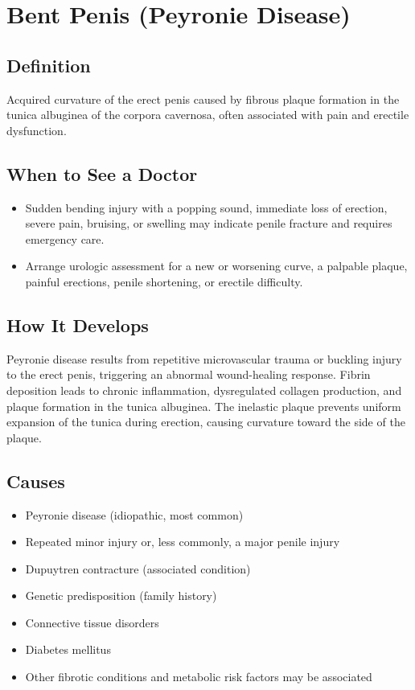 \chapter{Bent Penis (Peyronie Disease)}

\section*{Definition}
Acquired curvature of the erect penis caused by fibrous plaque formation in the tunica albuginea of the corpora cavernosa, often associated with pain and erectile dysfunction.

\section*{When to See a Doctor}

\begin{itemize}
 \item Sudden bending injury with a popping sound, immediate loss of erection, severe pain, bruising, or swelling may indicate penile fracture and requires emergency care.
 \item Arrange urologic assessment for a new or worsening curve, a palpable plaque, painful erections, penile shortening, or erectile difficulty.
\end{itemize}

\section*{How It Develops}
Peyronie disease results from repetitive microvascular trauma or buckling injury to the erect penis, triggering an abnormal wound-healing response. Fibrin deposition leads to chronic inflammation, dysregulated collagen production, and plaque formation in the tunica albuginea. The inelastic plaque prevents uniform expansion of the tunica during erection, causing curvature toward the side of the plaque.

\section*{Causes}
\begin{itemize}
 \item Peyronie disease (idiopathic, most common)
 \item Repeated minor injury or, less commonly, a major penile injury
 \item Dupuytren contracture (associated condition)
 \item Genetic predisposition (family history)
 \item Connective tissue disorders
 \item Diabetes mellitus
 \item Other fibrotic conditions and metabolic risk factors may be associated
\end{itemize}


